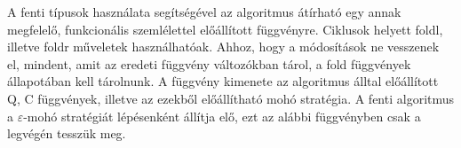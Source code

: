 \documentclass[12pt]{article}
\begin{document}
	\vspace{1cm}
	\noindent{}
	\vspace{1.5em}
	
	A fenti típusok használata segítségével az algoritmus átírható egy annak megfelelő, funkcionális szemlélettel előállított függvényre. Ciklusok helyett foldl, illetve foldr műveletek használhatóak. Ahhoz, hogy a módosítások ne vesszenek el, mindent, amit az eredeti függvény változókban tárol, a fold függvények állapotában kell tárolnunk. A függvény kimenete az algoritmus álltal előállított Q, C függvények, illetve az ezekből előállítható mohó stratégia. A fenti algoritmus a $\varepsilon$-mohó stratégiát lépésenként állítja elő, ezt az alábbi függvényben csak a legvégén tesszük meg.
	
\end{document}
